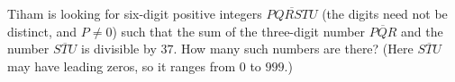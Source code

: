 Tiham is looking for six-digit positive integers $\overline{PQRSTU}$ (the digits need not be distinct, and $P\ne0$) such that the sum of the three-digit number $\overline{PQR}$ and the number $\overline{STU}$ is divisible by $37$. How many such numbers are there? (Here $\overline{STU}$ may have leading zeros, so it ranges from $0$ to $999$.)
